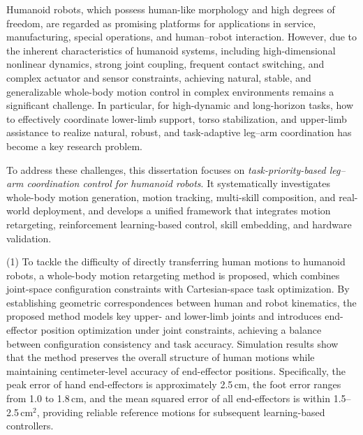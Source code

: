 \begin{eabstract}
	
	Humanoid robots, which possess human-like morphology and high degrees of freedom, are regarded as promising platforms for applications in service, manufacturing, special operations, and human–robot interaction. However, due to the inherent characteristics of humanoid systems, including high-dimensional nonlinear dynamics, strong joint coupling, frequent contact switching, and complex actuator and sensor constraints, achieving natural, stable, and generalizable whole-body motion control in complex environments remains a significant challenge. In particular, for high-dynamic and long-horizon tasks, how to effectively coordinate lower-limb support, torso stabilization, and upper-limb assistance to realize natural, robust, and task-adaptive leg–arm coordination has become a key research problem.
	
	To address these challenges, this dissertation focuses on \textit{task-priority-based leg–arm coordination control for humanoid robots}. It systematically investigates whole-body motion generation, motion tracking, multi-skill composition, and real-world deployment, and develops a unified framework that integrates motion retargeting, reinforcement learning-based control, skill embedding, and hardware validation.
	
	(1) To tackle the difficulty of directly transferring human motions to humanoid robots, a whole-body motion retargeting method is proposed, which combines joint-space configuration constraints with Cartesian-space task optimization. By establishing geometric correspondences between human and robot kinematics, the proposed method models key upper- and lower-limb joints and introduces end-effector position optimization under joint constraints, achieving a balance between configuration consistency and task accuracy. Simulation results show that the method preserves the overall structure of human motions while maintaining centimeter-level accuracy of end-effector positions. Specifically, the peak error of hand end-effectors is approximately 2.5\,cm, the foot error ranges from 1.0 to 1.8\,cm, and the mean squared error of all end-effectors is within 1.5--2.5\,cm$^2$, providing reliable reference motions for subsequent learning-based controllers.
	

\end{eabstract}

